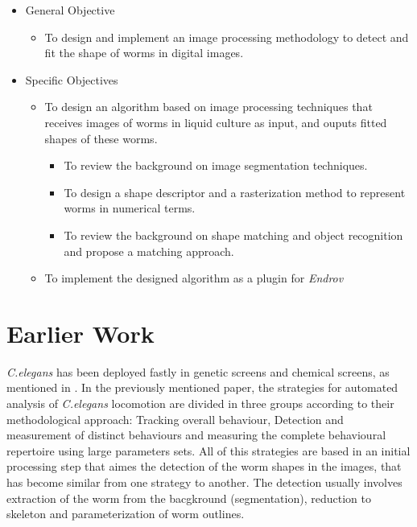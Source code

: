 \begin{itemize}
\item General Objective
  \begin{itemize}
  \item To design and implement an image processing methodology to detect
    and fit the shape of worms in digital images.    
  \end{itemize}
\end{itemize}
\begin{itemize}
\item Specific Objectives
  \begin{itemize}
  \item To design an algorithm based on image processing techniques that
    receives images of worms in liquid culture as input, and ouputs
    fitted shapes of these worms.
    \begin{itemize}
    \item To review the background on image segmentation techniques.    
    \item To design a shape descriptor and a rasterization method to
      represent worms in numerical terms.
    \item To review the background on shape matching and object recognition and
      propose a matching approach.    
    \end{itemize}
  \item To implement the designed algorithm as a plugin for \emph{Endrov}
  \end{itemize}
\end{itemize}

\section{Earlier Work}

\emph{C.elegans} has been deployed fastly in genetic screens and chemical
screens, as mentioned in \cite{automated}. In the previously mentioned paper,
the strategies for automated analysis of \emph{C.elegans} locomotion are
divided in three groups according to their methodological approach:
Tracking overall behaviour, Detection and measurement of distinct behaviours and
measuring the complete behavioural repertoire using large parameters sets.
All of this strategies are based in an initial processing step that aimes 
the detection of the worm shapes in the images, that has become similar
from one strategy to another. The detection usually involves extraction
of the worm from the bacgkround (segmentation), reduction to
skeleton and parameterization of worm outlines.\\

